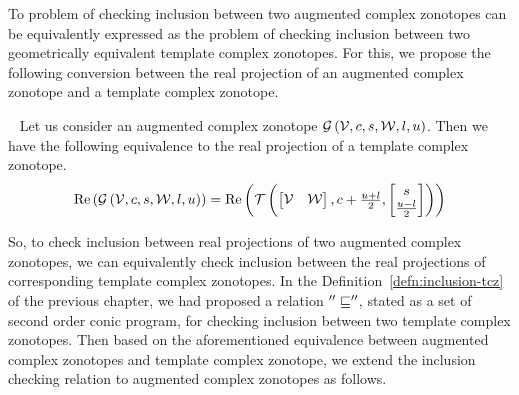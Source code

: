 %
To problem of checking inclusion between two augmented complex
zonotopes can be equivalently expressed as the problem of checking
inclusion between two geometrically equivalent template complex
zonotopes.  For this, we propose the following conversion between the
real projection of an augmented complex zonotope and a template
complex zonotope.
%
\begin{lemma}~\label{lem:acz-tcz-conversion}
Let us consider an augmented complex zonotope
$\mathcal{G}\left(\mathcal{V},c,s,\mathcal{W},l,u\right)$.  Then we have the
following equivalence to the real projection of a template complex zonotope.
%
\begin{align*}
  \operatorname{Re}\left(\mathcal{G}\left(\mathcal{V},c,s,\mathcal{W},l,u\right)\right)
  = \operatorname{Re}\left(\mathit{\operatorname{\mathcal{T}}}\left(\left[\begin{matrix}
      \mathcal{V} &
      \mathcal{W}
    \end{matrix}\right]
  ,\begin{matrix}
      c+\frac{u+l}{2}
    \end{matrix}
  ,\left[\begin{matrix}
      s\\
      \frac{u-l}{2}
    \end{matrix}\right]
  \right)
  \right)
\end{align*}
%
\end{lemma}
%
So, to check inclusion between real projections of two augmented
complex zonotopes, we can equivalently check inclusion between the
real projections of corresponding template complex zonotopes.  In the
Definition~\ref{defn:inclusion-tcz} of the previous chapter, we had
proposed a relation $''\sqsubseteq''$, stated as a set of second order
conic program, for checking inclusion between two template complex
zonotopes.  Then based on the aforementioned equivalence between
augmented complex zonotopes and template complex zonotope, we extend
the inclusion checking relation to augmented complex zonotopes as
follows.
%

